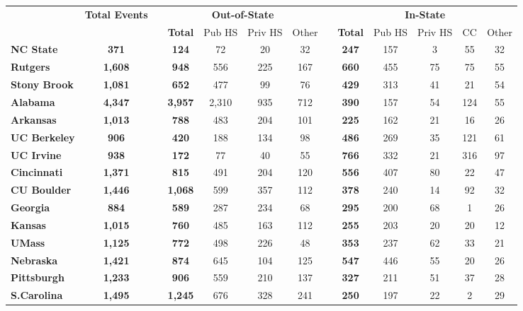 \begin{tabular*}{\textwidth}{@{\extracolsep{\fill} } lcccccccccccc}%
&\bfseries Total Events&&\multicolumn{4}{c}{\bfseries Out-of-State}&&\multicolumn{5}{c}{\bfseries In-State}\\%
&&&\bfseries Total&Pub HS&Priv HS&Other&&\bfseries Total&Pub HS&Priv HS&CC&Other\\%
\hline%
\bfseries NC State&\bfseries 371&&\bfseries 124&72&20&32&&\bfseries 247&157&3&55&32\\%
\bfseries Rutgers&\bfseries 1,608&&\bfseries 948&556&225&167&&\bfseries 660&455&75&75&55\\%
\bfseries Stony Brook&\bfseries 1,081&&\bfseries 652&477&99&76&&\bfseries 429&313&41&21&54\\%
\bfseries Alabama&\bfseries 4,347&&\bfseries 3,957&2,310&935&712&&\bfseries 390&157&54&124&55\\%
\bfseries Arkansas&\bfseries 1,013&&\bfseries 788&483&204&101&&\bfseries 225&162&21&16&26\\%
\bfseries UC Berkeley&\bfseries 906&&\bfseries 420&188&134&98&&\bfseries 486&269&35&121&61\\%
\bfseries UC Irvine&\bfseries 938&&\bfseries 172&77&40&55&&\bfseries 766&332&21&316&97\\%
\bfseries Cincinnati&\bfseries 1,371&&\bfseries 815&491&204&120&&\bfseries 556&407&80&22&47\\%
\bfseries CU Boulder&\bfseries 1,446&&\bfseries 1,068&599&357&112&&\bfseries 378&240&14&92&32\\%
\bfseries Georgia&\bfseries 884&&\bfseries 589&287&234&68&&\bfseries 295&200&68&1&26\\%
\bfseries Kansas&\bfseries 1,015&&\bfseries 760&485&163&112&&\bfseries 255&203&20&20&12\\%
\bfseries UMass&\bfseries 1,125&&\bfseries 772&498&226&48&&\bfseries 353&237&62&33&21\\%
\bfseries Nebraska&\bfseries 1,421&&\bfseries 874&645&104&125&&\bfseries 547&446&55&20&26\\%
\bfseries Pittsburgh&\bfseries 1,233&&\bfseries 906&559&210&137&&\bfseries 327&211&51&37&28\\%
\bfseries S.Carolina&\bfseries 1,495&&\bfseries 1,245&676&328&241&&\bfseries 250&197&22&2&29\\%
\hline%
\end{tabular*}